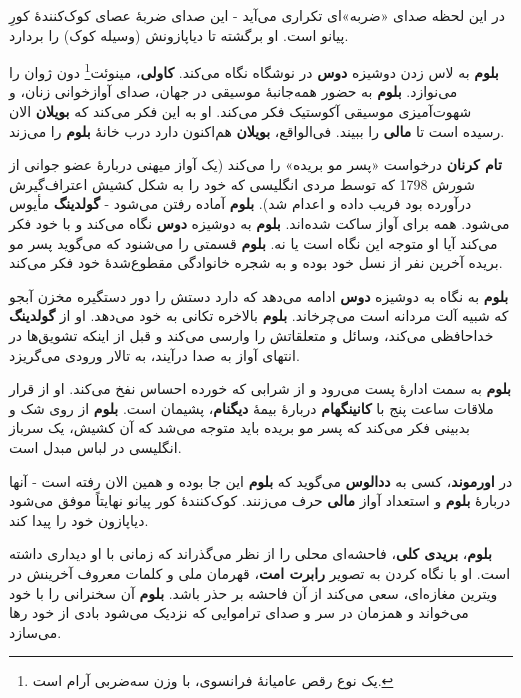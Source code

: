 \documentclass[12pt]{book}
\newcommand{\noun}[1]{{\textbf{#1}}}
\begin{document}
    در این لحظه صدای «ضربه»‌ای تکراری می‌آید - این صدای ضربهٔ عصای کوک‌کنندهٔ کورِ پیانو است. او برگشته تا دیاپازونش (وسیله کوک) را بردارد.

    \noun{بلوم} به لاس زدن دوشیزه \noun{دوس} در نوشگاه نگاه می‌کند. \noun{کاولی}، مینوئت\footnote{یک نوع رقص عامیانهٔ فرانسوی، با وزن سه‌ضربی آرام است.} دون ژوان را می‌نوازد. \noun{بلوم} به حضور همه‌جانبهٔ موسیقی در جهان، صدای آوازخوانی زنان، و شهوت‌آمیزی موسیقی آکوستیک فکر می‌کند. او به این فکر می‌کند که \noun{بویلان} الان رسیده است تا \noun{مالی} را ببیند. فی‌الواقع، \noun{بویلان} هم‌اکنون دارد درب خانهٔ \noun{بلوم} را می‌زند.

    \noun{تام کرنان} درخواست «پسر مو بریده» را می‌کند (یک آواز میهنی دربارهٔ عضو جوانی از شورش 1798 که توسط مردی انگلیسی که خود را به شکل کشیش اعتراف‌گیرش درآورده بود فریب داده و اعدام شد). \noun{بلوم} آماده رفتن می‌شود - \noun{گولدینگ} مأیوس می‌شود. همه برای آواز ساکت شده‌اند. \noun{بلوم} به دوشیزه \noun{دوس} نگاه می‌کند و با خود فکر می‌کند آیا او متوجه این نگاه است یا نه. \noun{بلوم} قسمتی را می‌شنود که می‌گوید پسر مو بریده آخرین نفر از نسل خود بوده و به شجره خانوادگی مقطوع‌شدهٔ خود فکر می‌کند.

    \noun{بلوم} به نگاه به دوشیزه \noun{دوس} ادامه می‌دهد که دارد دستش را دور دستگیره مخزن آبجو که شبیه آلت مردانه است می‌چرخاند. \noun{بلوم} بالاخره تکانی به خود می‌دهد. او از \noun{گولدینگ} خداحافظی می‌کند، وسائل و متعلقاتش را وارسی می‌کند و قبل از اینکه تشویق‌ها در انتهای آواز به صدا درآیند، به تالار ورودی می‌گریزد.

    \noun{بلوم} به سمت ادارهٔ پست می‌رود و از شرابی که خورده احساس نفخ می‌کند. او از قرار ملاقات ساعت پنج با \noun{کانینگهام} دربارهٔ بیمهٔ \noun{دیگنام}، پشیمان است. \noun{بلوم} از روی شک و بدبینی فکر می‌کند که پسر مو بریده باید متوجه می‌شد که آن کشیش، یک سرباز انگلیسی در لباس مبدل است.

    در \noun{اورموند}، کسی به \noun{ددالوس} می‌گوید که \noun{بلوم} این جا بوده و همین الان رفته است - آنها دربارهٔ \noun{بلوم} و استعداد آواز \noun{مالی} حرف می‌زنند. کوک‌کنندهٔ کور پیانو نهایتاً موفق می‌شود دیاپازون خود را پیدا کند.

    \noun{بلوم}، \noun{بریدی کلی}، فاحشه‌ای محلی را از نظر می‌گذراند که زمانی با او دیداری داشته است. او با نگاه کردن به تصویر \noun{رابرت امت}، قهرمان ملی و کلمات معروف آخرینش در ویترین مغازه‌ای، سعی می‌کند از آن فاحشه بر حذر باشد. \noun{بلوم} آن سخنرانی را با خود می‌خواند و همزمان در سر و صدای تراموایی که نزدیک می‌شود بادی از خود رها می‌سازد.
\end{document}

